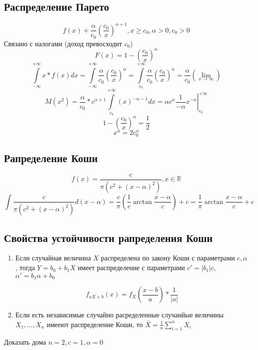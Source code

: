 \documentclass[14pt]{extarticle}
\newcommand{\bm}[1]{ \left.#1\right|}
\begin{document}
\subsection{Распределение Парето}
\begin{equation}
f(x) + \frac{\alpha	}{c_0} (\frac{c_0}{x})^{\alpha +1}, x\ge  c_0, \alpha >0 ,c_0 >0
\end{equation} 
Связано с налогами (доход превосходит $c_0$)
\begin{equation}
F(x) = 1 - \left(\frac{c_0}{x}\right)^{\alpha}
\end{equation} 
\begin{equation}
\int\limits_{-\infty}^{+\infty} x * f(x) dx =
\int\limits_{-\infty}^{+\infty} \frac{\alpha}{c_0} \left(
\frac{c_0}{x}\right)^{\alpha} = 
\int\limits_{c_0}^{+\infty}  \frac{\alpha}{c_0} 
(\frac{c_0}{x})^{\alpha} =
\frac{\alpha}{c_0} (\lim_{x \to \infty} )
\end{equation} 
\begin{equation}
M(x^2) = 
\frac{\alpha}{c_0} * c^{\alpha+1} \int\limits_{c_0}^{+\infty}   (x)^{-\alpha - 1} dx = 
\alpha c^{\alpha} \bm{\frac{1}{- \alpha} x^{-\alpha}}_{c_0}^{+\infty}
\end{equation} 
\begin{equation}
	1 - (\frac{c_0}{x})^{\alpha} =
	 \frac{1}{2}
\end{equation} 
\begin{equation}
x^{\alpha} = 2c_0^{\alpha}
\end{equation} 
\subsection{Рапределение Коши}
\begin{equation}
f(x) = \frac{c}{\pi (c^2 + (x - \alpha)^2)}, x \in \mathbb{R}
\end{equation} 
\begin{equation}
\int \frac{c}{\pi (c^2 + (x - \alpha)^2)} d(x - \alpha) =
\frac{c}{\pi} \left(\frac{1}{c} \arctan{\frac{x - \alpha}{c}}\right) + c = \frac{1}{\pi} \arctan{\frac{x - \alpha}{c}} + c
\end{equation} 
\subsection{Свойства устойчивости рапределения Коши}
\begin{enumerate}
	\item Если случайная величина
		$X$ распределена по закону Коши с параметрами
		 $c,\alpha$ ,
		 тогда  $Y = b_0 + b_1 X$ 
		 имеет распределение с параметрами $c' = |b_1| c$, $\alpha' = b_1 \alpha + b_0$

\begin{equation}
f_{a X + b} (x) = f_{X} \left(\frac{x-b}{a}\right) * \frac{1}{|a|}
\end{equation} 
\item Если есть независимые случайно расределенные случанйые
	величины $X_1,\dots,X_{n}$ 
	имееют распределение Коши, то $\overline{X} = \frac{1}{n}\sum_{i = 1}^{n} X_{i}$
\end{enumerate}
Доказать дома $n = 2,c=1,\alpha = 0$
\end{document}
